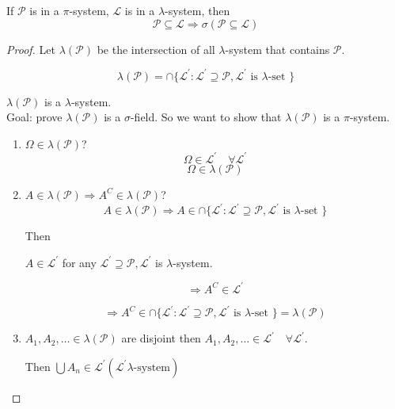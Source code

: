 \documentclass[11pt,fleqn]{book} %
\begin{document}
\begin{theorem}
	If $\mathcal{P}$ is in a $\pi$-system, $\mathcal{L}$ is in a $\lambda$-system, then 
	$$\mathcal{P} \subseteq \mathcal{L} \Rightarrow \sigma(\mathcal{P} \subseteq \mathcal{L}) $$
\end{theorem}

\begin{proof}
	Let $\lambda(\mathcal{P})$ be the intersection of all $\lambda$-system that contains $\mathcal{P}$. 

		$$ \lambda(\mathcal{P}) = \cap\{\mathcal{L}^\prime: \mathcal{L}^\prime \supseteq \mathcal{P}, \mathcal{L}^\prime \text{ is }\lambda\text{-set }\}$$

	$\lambda(\mathcal{P})$ is a $\lambda$-system.\\

	Goal: prove $\lambda(\mathcal{P})$ is a $\sigma$-field.
	So we want to show that $\lambda(\mathcal{P})$ is a $\pi$-system.

	\begin{enumerate}
		\item $\Omega \in \lambda(\mathcal{P})$?\\

			$$\Omega \in \mathcal{L}^\prime \quad \forall \mathcal{L}^\prime$$
			$$\Omega \in \lambda(\mathcal{P}) $$

		\item $A \in \lambda(\mathcal{P}) \Rightarrow A^C \in \lambda(\mathcal{P})$?\\

		$$A \in \lambda(\mathcal{P}) \Rightarrow A \in \cap\{\mathcal{L}^\prime: \mathcal{L}^\prime \supseteq \mathcal{P}, \mathcal{L}^\prime \text{ is }\lambda\text{-set }\} $$

		Then 

		$A \in \mathcal{L}^\prime$ for any $\mathcal{L}^\prime \supseteq \mathcal{P}, \mathcal{L}^\prime$ is $\lambda$-system. 

		$$\Rightarrow A^C \in \mathcal{L}^\prime $$

		$$\Rightarrow A^C \in  \cap\{\mathcal{L}^\prime: \mathcal{L}^\prime \supseteq \mathcal{P}, \mathcal{L}^\prime \text{ is }\lambda\text{-set }\} = \lambda(\mathcal{P})$$

		\item $A_1, A_2, \dots \in \lambda(\mathcal{P})$ are disjoint then $A_1, A_2, \dots \in \mathcal{L}^\prime \quad \forall \mathcal{L}^\prime$. 

		Then $\bigcup A_n \in \mathcal{L}^\prime (\mathcal{L}^\prime \lambda\text{-system})$


\end{enumerate}
\end{proof}
\end{document}
